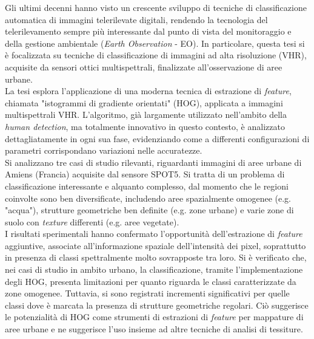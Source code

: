 
\italiano
\sommario
{}

Gli ultimi decenni hanno visto un crescente sviluppo di tecniche di classificazione automatica di immagini telerilevate digitali, rendendo la tecnologia del telerilevamento sempre più interessante dal punto di vista del monitoraggio e della gestione ambientale (\emph{Earth Observation} - EO).
In particolare, questa tesi si è focalizzata su tecniche di classificazione di immagini ad alta risoluzione (VHR), acquisite da sensori ottici multispettrali, finalizzate all'osservazione di aree urbane. 
\\
La tesi esplora l'applicazione di una moderna tecnica di estrazione di \emph{feature}, chiamata "istogrammi di gradiente orientati" (HOG), applicata a immagini multispettrali VHR.   
L'algoritmo, già largamente utilizzato nell'ambito della \emph{human detection}, ma totalmente innovativo in questo contesto, è analizzato dettagliatamente in ogni sua fase, evidenziando come a differenti configurazioni di parametri corrispondano variazioni nelle accuratezze. 
\\
Si analizzano tre casi di studio rilevanti, riguardanti immagini di aree urbane di Amiens (Francia) acquisite dal sensore SPOT5. Si tratta di un problema di classificazione interessante e alquanto complesso, dal momento che le regioni coinvolte sono ben diversificate, includendo aree spazialmente omogenee (e.g. "acqua"), strutture geometriche ben definite (e.g. zone urbane) e varie zone di suolo con \emph{texture} differenti (e.g. aree vegetate).
\\
I risultati sperimentali hanno confermato l'opportunità dell'estrazione di \emph{feature} aggiuntive, associate all'informazione spaziale dell'intensità dei pixel, soprattutto in presenza di  classi spettralmente molto sovrapposte tra loro. Si è verificato che, nei casi di studio in ambito urbano, la classificazione, tramite l'implementazione degli HOG, presenta limitazioni per quanto riguarda le classi caratterizzate da zone omogenee. Tuttavia, si sono registrati incrementi significativi per quelle classi dove è marcata la presenza di strutture geometriche regolari.
Ciò suggerisce le potenzialità di HOG come strumenti di estrazioni di \emph{feature} per mappature di aree urbane e ne suggerisce l'uso insieme ad altre tecniche di analisi di tessiture.



